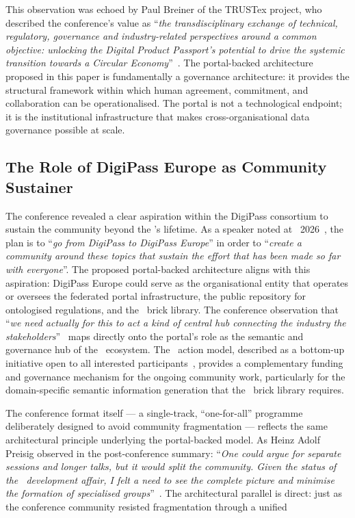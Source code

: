 This observation was echoed by Paul Breiner of the TRUSTex project, who
described the conference's value as ``\textit{the transdisciplinary exchange of
technical, regulatory, governance and industry-related perspectives around a
common objective: unlocking the Digital Product Passport's potential to drive
the systemic transition towards a Circular
Economy}''~\cite{dpp4eu2026_postconf}. The portal-backed architecture proposed
in this paper is fundamentally a governance architecture: it provides the
structural framework within which human agreement, commitment, and collaboration
can be operationalised. The portal is not a technological endpoint; it is the
institutional infrastructure that makes cross-organisational data governance
possible at scale.

\subsection{The Role of DigiPass Europe as Community Sustainer}

The conference revealed a clear aspiration within the DigiPass consortium to
sustain the community beyond the \CSA's lifetime. As a speaker noted at
\DPPforEU~2026~\cite{dpp4eu2026_day2}, the plan is to ``\textit{go from DigiPass
to DigiPass Europe}'' in order to ``\textit{create a community around these
topics that sustain the effort that has been made so far with everyone}''. The
proposed portal-backed architecture aligns with this aspiration: DigiPass Europe
could serve as the organisational entity that operates or oversees the federated
portal infrastructure, the public repository for ontologised regulations, and
the \SHACL\ brick library. The conference observation that ``\textit{we need
actually for this to act a kind of central hub connecting the industry the
stakeholders}''~\cite{dpp4eu2026_day2} maps directly onto the portal's role as
the semantic and governance hub of the \DPP\ ecosystem. The \COST\ action model,
described as a bottom-up initiative open to all interested
participants~\cite{dpp4eu2026_day2}, provides a complementary funding and
governance mechanism for the ongoing community work, particularly for the
domain-specific semantic information generation that the \SHACL\ brick library
requires.

The conference format itself --- a single-track, ``one-for-all'' programme
deliberately designed to avoid community fragmentation --- reflects the same
architectural principle underlying the portal-backed model. As Heinz Adolf
Preisig observed in the post-conference summary: ``\textit{One could argue for
separate sessions and longer talks, but it would split the community. Given the
status of the \DPP\ development affair, I felt a need to see the complete
picture and minimise the formation of specialised
groups}''~\cite{dpp4eu2026_postconf}. The architectural parallel is direct: just
as the conference community resisted fragmentation through a unified
